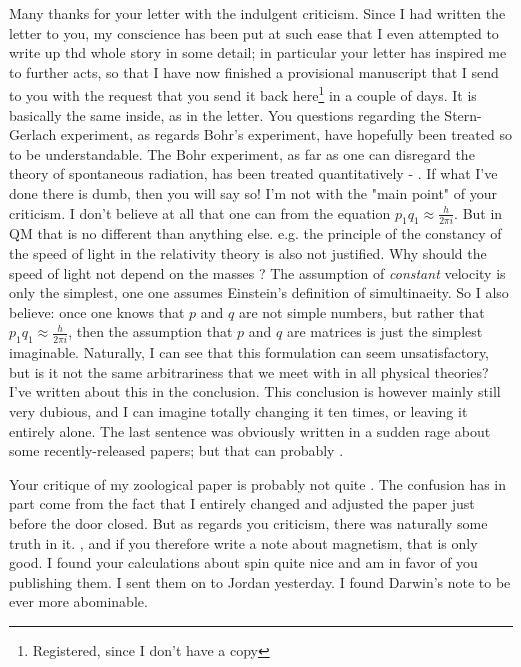 \documentclass{article}
\begin{document}
Many thanks for your letter with the indulgent criticism. Since I had written the letter to you, my conscience has been put at such ease that I even attempted to write up thd whole story in some detail; in particular your letter has inspired me to further acts, so that I have now finished a provisional manuscript that I send to you with the request that you send it back here\footnote{Registered, since I don't have a copy} in a couple of days. It is basically the same inside, as in the letter.
You questions regarding the Stern-Gerlach experiment, as regards Bohr's experiment, have hopefully been treated so to be understandable. The Bohr experiment, as far as one can disregard the theory of spontaneous radiation, has been treated quantitatively - . If what I've done there is dumb, then you will say so! I'm not  with the "main point" of your criticism. I don't believe at all that one can  from the equation $p_1 q_1 \approx \frac{h}{2\pi i}$. But in QM that is no different than anything else. e.g. the principle of the constancy of the speed of light in the relativity theory is also not justified. Why should the speed of light not depend on the masses ? The assumption of \textit{constant} velocity is only the simplest, one one assumes Einstein's definition of simultinaeity. So I also believe: once one knows that $p$ and $q$ are not simple numbers, but rather that $p_1 q_1 \approx \frac{h}{2\pi i}$, then the assumption that $p$ and $q$ are matrices is just the simplest imaginable. Naturally, I can see that this formulation can seem unsatisfactory, but is it not the same arbitrariness that we meet with in all physical theories? I've written about this in the conclusion. This conclusion is however mainly still very dubious, and I can imagine totally changing it ten times, or leaving it entirely alone. The last sentence was obviously written in a sudden rage about some recently-released papers; but that can probably .

Your critique of my zoological paper is probably not quite . The confusion has in part come from the fact that I entirely changed and adjusted the paper just before the door closed. But as regards you criticism, there was naturally some truth in it. , and if you therefore write a note about magnetism, that is only good. I found your calculations about spin quite nice and am in favor of you publishing them. I sent them on to Jordan yesterday. I found Darwin's note to be ever more abominable.
\end{document}
